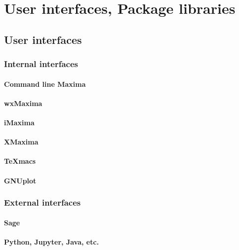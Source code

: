 \documentclass[../Maxima_Workbook.tex]{subfiles}
\begin{document}
\part{User interfaces, Package libraries}

\chapter{User interfaces}

\section{Internal interfaces}

\subsection{Command line Maxima}\label{UI1}

\subsection{wxMaxima}\label{UI1a}

\subsection{iMaxima}

\subsection{XMaxima}

\subsection{TeXmacs}

\subsection{GNUplot}

\section{External interfaces}

\subsection{Sage}

\subsection{Python, Jupyter, Java, etc.}
\end{document}
